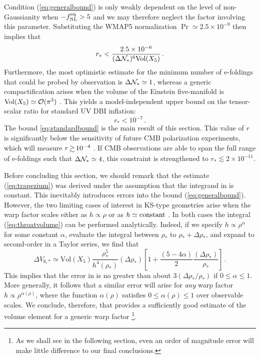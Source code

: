 Condition (\ref{eq:generalbound}) is 
only weakly dependent on the level of non-Gaussianity 
when $-f_{\mathrm{NL}}^{\mathrm{eq}} > 5$ and we may therefore neglect the 
factor involving this parameter. 
Substituting the WMAP5 normalization 
$\Pr \simeq 2.5 \times 10^{-9}$ then implies that
%  
\begin{equation}
\label{eq:upperbound}
r_{*} < \frac{2.5\times 10^{-6}}{( \Delta \mathcal{N}_*)^6 \mathrm{Vol}(X_5)} \,.
\end{equation}
% 
Furthermore, the most optimistic 
estimate for the minimum number of e-foldings that could be 
probed by observation is $\Delta \mathcal{N}_{*} \simeq 1$, whereas
a generic compactification arises when 
the volume of the Einstein five-manifold is $\mathrm{Vol}(X_5) 
\simeq {\cal{O}} (\pi^3)$ \cite{ks}. This yields a model-independent 
upper bound on the tensor-scalar ratio for standard UV DBI inflation:
%    
\begin{equation}
\label{eq:standardbound}
r_* < 10^{-7} \,.
\end{equation}
% 
The bound \eqref{eq:standardbound} is the main result of this section.
This value of $r$ is significantly below the sensitivity 
of future CMB polarization experiments, which will measure 
${r} \, {\gsim} \, 10^{-4}$ \cite{Baumann:2008aq,vpj}. 
If CMB  
observations are able to span the full range of e-foldings such that
$\Delta \mathcal{N}_* \simeq 4$, this constraint is strengthened to 
${r_*} \lesssim {2 \times 10^{-11}}$.


Before concluding this section, we should remark that 
the estimate (\ref{eq:trapezium}) was derived under the assumption  
that the integrand in   
is constant. This inevitably introduces errors into the bound
(\ref{eq:generalbound}). However, the two limiting cases of interest 
in KS-type geometries arise 
when the warp factor scales either as $h \propto \rho$
or as $h \simeq {\rm constant}$ \cite{ks,kt}. In both cases
the integral (\ref{eq:throatvolume}) can be performed analytically. 
Indeed, if we specify $h \propto \rho^{\alpha}$ for some constant $\alpha$,  
evaluate the integral between $\rho_{*}$ 
to $\rho_{*}+\Delta \rho_{*}$, and expand to second-order in a 
Taylor series, we find that  
% 
\begin{equation}
\label{eq:limits}
\Delta V_{6,*} \simeq \mathrm{Vol}(X_5) \frac{\rho^5_{*}}{h^{4} 
(\rho_{*} )}(\Delta \rho_*) 
\left[ 1 +\frac{(5-4 \alpha )}{2} 
\frac{(\Delta \rho_*)}{\rho_{*}} \right]  \,.
\end{equation}
% 
This implies that the error in  
is no greater than 
about $3 (\Delta \rho_* / \rho_*)$ if  
$0 \le \alpha \le 1$. More generally, it follows that a similar
error will arise for {\em any} warp factor 
$h \propto \rho^{\alpha (\rho )}$, where the function 
$\alpha (\rho)$ satisfies $0 \le \alpha (\rho ) \le 1$ 
over observable scales. 
We conclude, therefore, that  
provides a sufficiently good estimate of the volume element  
for a generic warp factor
\footnote{As we shall see in the following section, 
even an order of magnitude error will make little 
difference to our final conclusions.}.  
% 
% 
% 
% 
